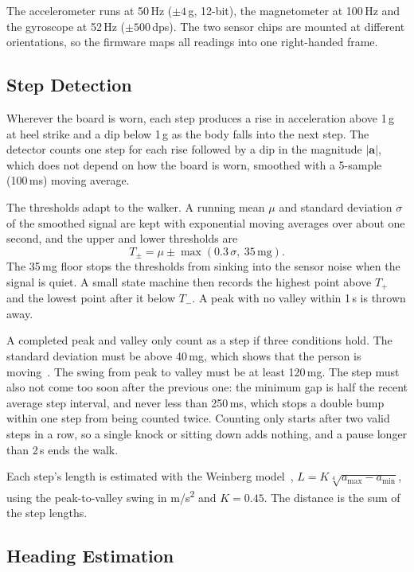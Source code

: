 \documentclass[conference,a4paper]{IEEEtran}
\begin{document}
The accelerometer runs at 50\,Hz ($\pm4$\,g, 12-bit), the magnetometer at 100\,Hz and the
gyroscope at 52\,Hz ($\pm500$\,dps). The two sensor chips are mounted at different
orientations, so the firmware maps all readings into one right-handed frame.

\subsection{Step Detection}
Wherever the board is worn, each step produces a rise in acceleration above 1\,g at heel strike
and a dip below 1\,g as the body falls into the next step. The detector counts one step for
each rise followed by a dip in the magnitude $|\mathbf{a}|$, which does not depend on how the
board is worn, smoothed with a 5-sample (100\,ms) moving average.

The thresholds adapt to the walker. A running mean $\mu$ and standard deviation $\sigma$ of the
smoothed signal are kept with exponential moving averages over about one second, and the upper
and lower thresholds are
\begin{equation}
T_\pm=\mu\pm\max(0.3\,\sigma,\ 35\,\text{mg}).
\end{equation}
The 35\,mg floor stops the thresholds from sinking into the sensor noise when the signal is
quiet. A small state machine then records the highest point above $T_+$ and the lowest point
after it below $T_-$. A peak with no valley within 1\,s is thrown away.

A completed peak and valley only count as a step if three conditions hold. The standard
deviation must be above 40\,mg, which shows that the person is moving~\cite{brajdic2013}. The
swing from peak to valley must be at least 120\,mg. The step must also not come too soon after
the previous one: the minimum gap is half the recent average step interval, and never less
than 250\,ms, which stops a double bump within one step from being counted twice. Counting only
starts after two valid steps in a row, so a single knock or sitting down adds nothing, and a
pause longer than 2\,s ends the walk.

Each step's length is estimated with the Weinberg model~\cite{weinberg2002},
$L=K\sqrt[4]{a_{\max}-a_{\min}}$, using the peak-to-valley swing in m/s\textsuperscript{2} and
$K=0.45$. The distance is the sum of the step lengths.

\subsection{Heading Estimation}
\end{document}

